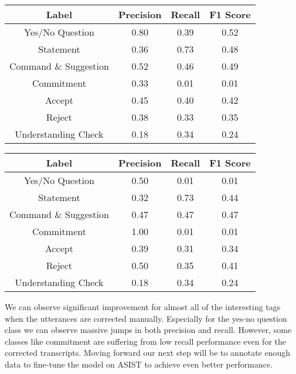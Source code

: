 \begin{center}
\begin{tabular}{||c c c c||}
 \hline
 Label & Precision & Recall & F1 Score\\ [0.5ex]
 \hline\hline
 Yes/No Question & 0.80 & 0.39  & 0.52\\
 \hline
 Statement & 0.36 & 0.73 & 0.48\\
 \hline
 Command \& Suggestion & 0.52 & 0.46 & 0.49\\
 \hline
 Commitment & 0.33 & 0.01 & 0.01\\
 \hline
 Accept & 0.45 & 0.40 &  0.42 \\
 \hline
  Reject & 0.38 & 0.33 & 0.35\\
 \hline
  Understanding Check & 0.18 & 0.34 & 0.24\\
 \hline
\end{tabular}
\end{center}

\begin{center}
\begin{tabular}{||c c c c||}
 \hline
 Label & Precision & Recall & F1 Score\\ [0.5ex]
 \hline\hline
 Yes/No Question & 0.50 & 0.01 & 0.01\\
 \hline
 Statement & 0.32 & 0.73 & 0.44\\
 \hline
 Command \& Suggestion & 0.47 & 0.47 & 0.47\\
 \hline
 Commitment & 1.00 & 0.01 & 0.01\\
 \hline
 Accept & 0.39 & 0.31 &  0.34 \\
 \hline
  Reject & 0.50 & 0.35 & 0.41\\
 \hline
  Understanding Check & 0.18 & 0.34 & 0.24\\
 \hline
\end{tabular}
\end{center}

We can observe significant improvement for almost all of the interesting tags when the
utterances are corrected manually. Especially for the yes-no question class we can 
observe massive jumps in both precision and recall. However, some classes like commitment
are suffering from low recall performance even for the corrected transcripts. Moving forward
our next step will be to annotate enough data to fine-tune the model on ASIST to achieve
even better performance.

